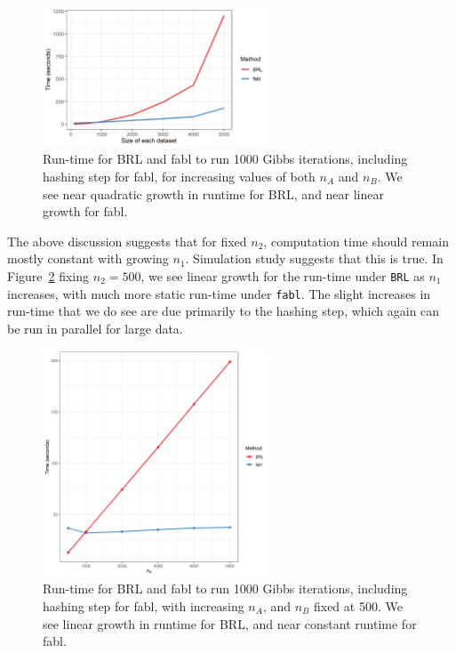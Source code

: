 \documentclass[12pt,letterpaper]{article}
\newcommand{\1}[1]{\mathbb{I}\!\left[#1\right]} %
\begin{document}
\begin{figure}[h!]
	\begin{center} \includegraphics[width=0.6\textwidth]{../notes/figures/sadinle_speed_plot2} 
	\caption{Run-time for BRL and fabl to run 1000 Gibbs iterations, including hashing step for fabl, for increasing values of both $n_A$ and $n_B$. We see near quadratic growth in runtime for BRL, and near linear growth for fabl.}\label{fig:speed1}
	\end{center}
\end{figure}

The above discussion suggests that for fixed \(n_2\), computation time
should remain mostly constant with growing \(n_1\). Simulation study
suggests that this is true. In Figure~\ref{fig:speed2} fixing \(n_2 = 500\), we
see linear growth for the run-time under \texttt{BRL} as \(n_1\)
increases, with much more static run-time under \texttt{fabl}. The
slight increases in run-time that we do see are due primarily to the
hashing step, which again can be run in parallel for large data.

\begin{figure}[h!]
	\begin{center} \includegraphics[width=0.6\textwidth]{../notes/figures/speed_plot_fixed_nB} 
	\caption{Run-time for BRL and fabl to run 1000 Gibbs iterations, including hashing step for fabl, with increasing $n_A$, and $n_B$ fixed at 500. We see linear growth in runtime for BRL, and near constant runtime for fabl.}\label{fig:speed2}
	\end{center}
\end{figure}
\end{document}
